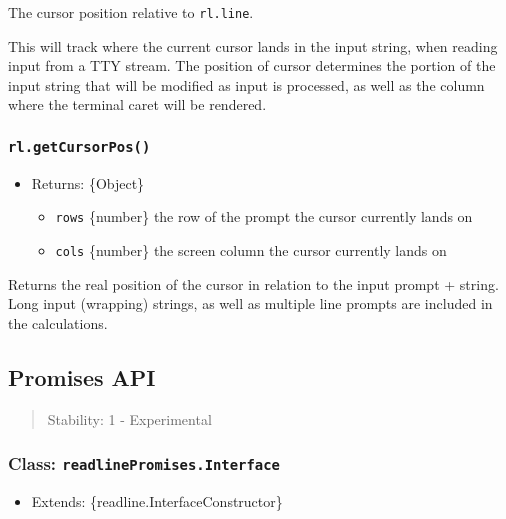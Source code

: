 The cursor position relative to \texttt{rl.line}.

This will track where the current cursor lands in the input string, when
reading input from a TTY stream. The position of cursor determines the
portion of the input string that will be modified as input is processed,
as well as the column where the terminal caret will be rendered.

\subsubsection{\texorpdfstring{\texttt{rl.getCursorPos()}}{rl.getCursorPos()}}\label{rl.getcursorpos}

\begin{itemize}
\tightlist
\item
  Returns: \{Object\}

  \begin{itemize}
  \tightlist
  \item
    \texttt{rows} \{number\} the row of the prompt the cursor currently
    lands on
  \item
    \texttt{cols} \{number\} the screen column the cursor currently
    lands on
  \end{itemize}
\end{itemize}

Returns the real position of the cursor in relation to the input prompt
+ string. Long input (wrapping) strings, as well as multiple line
prompts are included in the calculations.

\subsection{Promises API}\label{promises-api}

\begin{quote}
Stability: 1 - Experimental
\end{quote}

\subsubsection{\texorpdfstring{Class:
\texttt{readlinePromises.Interface}}{Class: readlinePromises.Interface}}\label{class-readlinepromises.interface}

\begin{itemize}
\tightlist
\item
  Extends: \{readline.InterfaceConstructor\}
\end{itemize}

